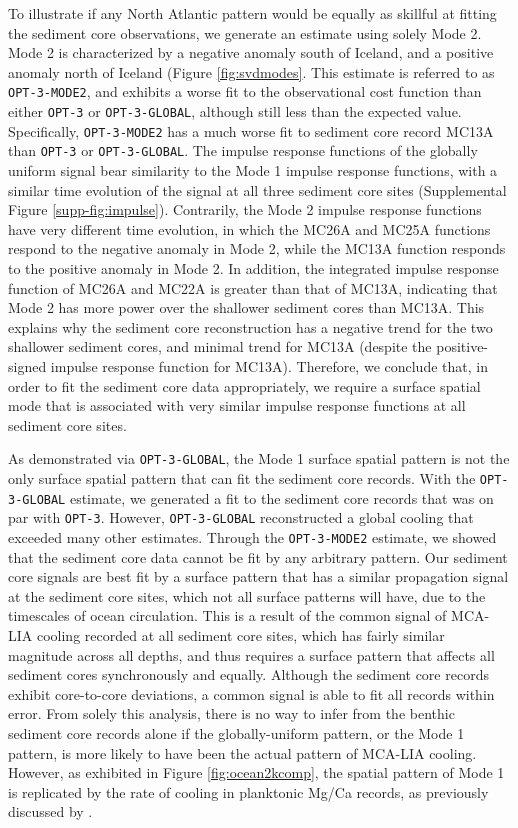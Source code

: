 \documentclass[draft]{agujournal2019}
\begin{document}
To illustrate if any North Atlantic pattern would be equally as skillful at fitting the sediment core observations, we generate an estimate using solely Mode 2. Mode 2 is characterized by a negative anomaly south of Iceland, and a positive anomaly north of Iceland (Figure \ref{fig:svdmodes}. This estimate is referred to as \texttt{OPT-3-MODE2}, and exhibits a worse fit to the observational cost function than either \texttt{OPT-3} or \texttt{OPT-3-GLOBAL}, although still less than the expected value. Specifically, \texttt{OPT-3-MODE2} has a much worse fit to sediment core record MC13A than \texttt{OPT-3} or \texttt{OPT-3-GLOBAL}. The impulse response functions of the globally uniform signal bear similarity to the Mode 1 impulse response functions, with a similar time evolution of the signal at all three sediment core sites (Supplemental Figure \ref{supp-fig:impulse}). Contrarily, the Mode 2 impulse response functions have very different time evolution, in which the MC26A and MC25A functions respond to the negative anomaly in Mode 2, while the MC13A function responds to the positive anomaly in Mode 2. In addition, the integrated impulse response function of MC26A and MC22A is greater than that of MC13A, indicating that Mode 2 has more power over the shallower sediment cores than MC13A. This explains why the sediment core reconstruction has a negative trend for the two shallower sediment cores, and minimal trend for MC13A (despite the positive-signed impulse response function for MC13A). Therefore, we conclude that, in order to fit the sediment core data appropriately, we require a surface spatial mode that is associated with very similar impulse response functions at all sediment core sites.

As demonstrated via \texttt{OPT-3-GLOBAL}, the Mode 1 surface spatial pattern is not the only surface spatial pattern that can fit the sediment core records. With the \texttt{OPT-3-GLOBAL} estimate, we generated a fit to the sediment core records that was on par with \texttt{OPT-3}. However, \texttt{OPT-3-GLOBAL} reconstructed a global cooling that exceeded many other estimates. Through the \texttt{OPT-3-MODE2} estimate, we showed that the sediment core data cannot be fit by any arbitrary pattern. Our sediment core signals are best fit by a surface pattern that has a similar propagation signal at the sediment core sites, which not all surface patterns will have, due to the timescales of ocean circulation. This is a result of the common signal of MCA-LIA cooling recorded at all sediment core sites, which has fairly similar magnitude across all depths, and thus requires a surface pattern that affects all sediment cores synchronously and equally. Although the sediment core records exhibit core-to-core deviations, a common signal is able to fit all records within error. From solely this analysis, there is no way to infer from the benthic sediment core records alone if the globally-uniform pattern, or the Mode 1 pattern, is more likely to have been the actual pattern of MCA-LIA cooling. However, as exhibited in Figure \ref{fig:ocean2kcomp}, the spatial pattern of Mode 1 is replicated by the rate of cooling in planktonic Mg/Ca records, as previously discussed by .
\end{document}
